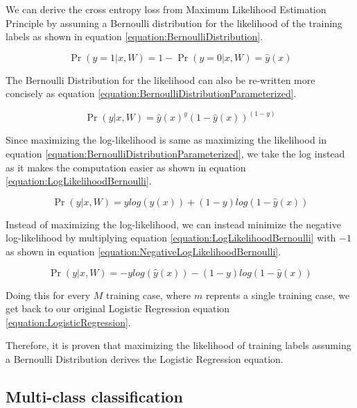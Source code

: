 \documentclass[a4paper,12pt]{article}
\begin{document}
We can derive the cross entropy loss from Maximum Likelihood Estimation Principle by assuming a Bernoulli distribution for the likelihood of the training labels as shown in equation \ref{equation:BernoulliDistribution}. 

\begin{equation}
\label{equation:BernoulliDistribution}
\Pr(y=1|x, W) = 1 - \Pr(y=0|x, W) = \hat{y}(x)
\end{equation}

The Bernoulli Distribution for the likelihood can also be re-written more concisely as equation \ref{equation:BernoulliDistributionParameterized}. 

\begin{equation}
\label{equation:BernoulliDistributionParameterized}
\Pr(y|x, W) = \hat{y}(x)^{y}(1-\hat{y}(x))^{(1-y)}
\end{equation}

Since maximizing the log-likelihood is same as maximizing the likelihood in equation \ref{equation:BernoulliDistributionParameterized}, we take the log instead as it makes the computation easier as shown in equation \ref{equation:LogLikelihoodBernoulli}. 

\begin{equation}
\label{equation:LogLikelihoodBernoulli}
\Pr(y|x, W) = ylog(\hat{y}(x)) + (1-y)log(1-\hat{y}(x))
\end{equation}

Instead of maximizing the log-likelihood, we can instead minimize the negative log-likelihood by multiplying equation \ref{equation:LogLikelihoodBernoulli} with $-1$ as shown in equation
\ref{equation:NegativeLogLikelihoodBernoulli}. 

\begin{equation}
\label{equation:NegativeLogLikelihoodBernoulli}
\Pr(y|x, W) = -ylog(\hat{y}(x)) - (1-y)log(1-\hat{y}(x))
\end{equation}

Doing this for every $M$ training case, where $m$ reprents a single training case, we get back to our original Logistic Regression equation \ref{equation:LogisticRegression}. 

Therefore, it is proven that maximizing the likelihood of training labels assuming a Bernoulli Distribution derives the Logistic Regression equation. 

\clearpage
\subsection{Multi-class classification}
\end{document}
